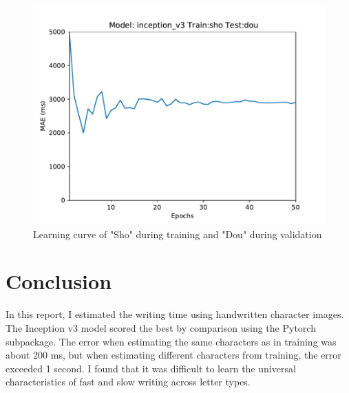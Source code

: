 \documentclass[10pt,twocolumn,letterpaper]{article}
\begin{document}
\begin{figure}[h]
    \begin{center}
        \includegraphics[width=0.8\linewidth]{images/inception_v3_sho_dou.pdf}
    \end{center}
    \caption{Learning curve of "Sho" during training and "Dou" during validation}
    \label{fig:sho_dou}
\end{figure}

\section{Conclusion}
In this report, I estimated the writing time using handwritten character images.
The Inception v3 model scored the best by comparison using the Pytorch subpackage.
The error when estimating the same characters as in training was about 200 ms,
but when estimating different characters from training, the error exceeded 1 second.
I found that it was difficult to learn the universal characteristics of fast and slow writing across letter types.

    {\small
        
        
    }
\end{document}
